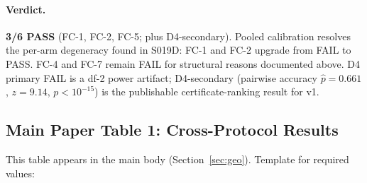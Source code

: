 \documentclass{article}
\begin{document}
\paragraph{Verdict.} \textbf{3/6 PASS} (FC-1, FC-2, FC-5; plus D4-secondary). Pooled calibration resolves the per-arm degeneracy found in S019D: FC-1 and FC-2 upgrade from FAIL to PASS. FC-4 and FC-7 remain FAIL for structural reasons documented above. D4 primary FAIL is a df-2 power artifact; D4-secondary (pairwise accuracy $\hat{p} = 0.661$, $z = 9.14$, $p < 10^{-15}$) is the publishable certificate-ranking result for v1.

\subsection{Main Paper Table 1: Cross-Protocol Results}
\label{app:table1_template}

This table appears in the main body (Section~\ref{sec:geo}). Template for required values:

\begin{table}[htbp]
\centering
\small
\caption{GeoRSCT results: $R^2$ by target family, solver family, and evaluation protocol. $N_{\text{ceiling}} = 1 - \max_k(R^2_k)$. The bottom row is the across-task mean of the per-task $\max_k - \min_k$ across the three core families and is distinct from $\max_k - \min_k$ of the ``All 27 mean'' row (those differ because per-task and across-task aggregations do not commute).}
\end{table}
\end{document}
